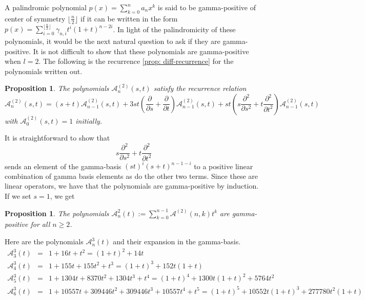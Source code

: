 \documentclass{article}
\newcommand{\dd}{\mathcal{D}}
\newcommand{\eul}{\mathcal{A}}
\newtheorem{proposition}[theorem]{Proposition}
\theoremstyle{definition}
\numberwithin{equation}{section}
\begin{document}
A palindromic polynomial $p(x)=\displaystyle\sum_{k=0}^n a_nx^k$ is said to be gamma-positive of center of symmetry $\lfloor \frac{n}{2}\rfloor$ if it can be written in the form $p(x)=\displaystyle\sum_{i=0}^{\lfloor\frac{n}{2} \rfloor} \gamma_{n,i}t^i(1+t)^{n-2i}$.
In light of the palindromicity of these polynomials, it would be the next natural question to ask if they are gamma-positive. It is not
difficult to show that these polynomials are gamma-positive when $l=2$.
The following is the recurrence \ref{prop: diff-recurrence} for the polynomials written out. 
\begin{proposition}
    The polynomials $\eul_n^{(2)}(s,t)$ satisfy the recurrence relation
    \begin{equation}
        \eul_n^{(2)}(s,t) = (s+t)\eul_{n-1}^{(2)}(s,t) + 3st(\frac{\partial }{\partial s}
        +\frac{\partial }{\partial t})\eul_{n-1}^{(2)}(s,t)+ st(s\frac{\partial^2 }{\partial s^2}
         + t\frac{\partial^2 }{\partial t^2})\eul_{n-1}^{(2)}(s,t)
    \end{equation}
    with $\eul_0^{(2)}(s,t)=1$ initially.
\end{proposition}
It is straightforward to show that $$s\frac{\partial^2 }{\partial s^2}
+ t\frac{\partial^2 }{\partial t^2}$$
sends an element of the gamma-basis $(st)^i(s+t)^{n-1-i}$ to a positive linear combination of gamma basis elements as do 
the other two terms. Since these are linear operators, we have that the polynomials are gamma-positive by induction. If we set $s=1$, we get

\begin{proposition}
    The polynomials $\eul_n^2(t):=\displaystyle \sum_{k=0}^{n-1} \eul^{(2)}(n,k)t^k$ are gamma-positive for all $n\ge 2$.
\end{proposition}

Here are the polynomials $\eul_n^3(t)$ and their expansion in the gamma-basis.
\begin{eqnarray*}
    \eul_3^3(t)&=& 1+16t+t^2=(1+t)^2+14t\\
    \eul_4^3(t)&=& 1+155t+155t^2+t^3=(1+t)^3+152t(1+t)\\
    \eul_5^3(t)&=& 1+1304t+8370t^2+1304t^3+t^4=(1+t)^4+1300t(1+t)^2+5764t^2\\
    \eul_6^3(t)&=& 1+10557t+309446t^2+309446t^3+10557t^4+t^5=(1+t)^5+10552t(1+t)^3+277780t^2(1+t)
\end{eqnarray*}
\end{document}
